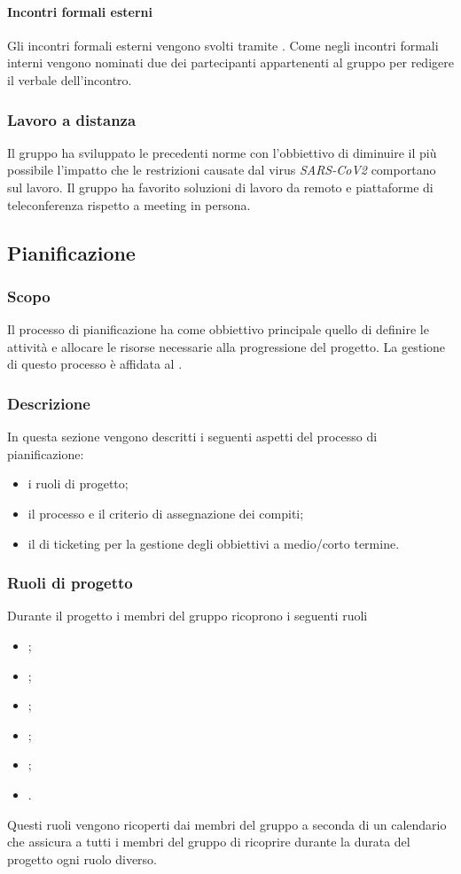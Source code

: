 \paragraph{Incontri formali esterni}
Gli incontri formali esterni vengono svolti tramite . Come negli incontri formali interni vengono nominati due dei partecipanti appartenenti al gruppo per redigere il verbale dell'incontro. 

\subsubsection{Lavoro a distanza}
Il gruppo ha sviluppato le precedenti norme con l'obbiettivo di diminuire il più possibile l'impatto che le restrizioni causate dal virus \textit{SARS-CoV2} comportano sul lavoro. Il gruppo ha favorito soluzioni di lavoro da remoto e piattaforme di teleconferenza rispetto a meeting in persona.

\subsection{Pianificazione}
\subsubsection{Scopo}
Il processo di pianificazione ha come obbiettivo principale quello di definire le attività e allocare le risorse necessarie alla progressione del progetto. La gestione di questo processo è affidata al \RdP{}.
\subsubsection{Descrizione}
In questa sezione vengono descritti i seguenti aspetti del processo di pianificazione:
\begin{itemize}
\item i ruoli di progetto;
\item il processo e il criterio di assegnazione dei compiti;
\item il  di ticketing per la gestione degli obbiettivi a medio/corto termine.
\end{itemize} 
\subsubsection{Ruoli di progetto}
Durante il progetto i membri del gruppo ricoprono i seguenti ruoli
\begin{itemize}
\item \RdP{};
\item \adm{};
\item \ana{};
\item \prog{};
\item \progr{};
\item \ver{}.
\end{itemize}
Questi ruoli vengono ricoperti dai membri del gruppo a seconda di un calendario che assicura a tutti i membri del gruppo di ricoprire durante la durata del progetto ogni ruolo diverso.

